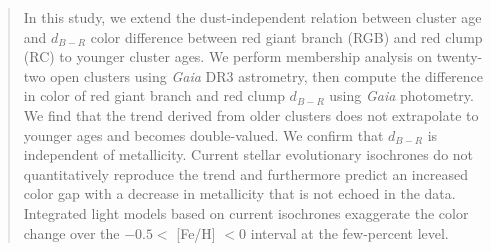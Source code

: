 \documentclass[twocolumn,times]{aastex631}
\begin{document}

\author[0009-0003-8929-7110]{Abigail R. Chriss}

\author[0000-0003-1388-5525]{Guy Worthey}



\begin{abstract}

In this study, we extend the dust-independent \citet{1991MNRAS.251..545H} relation between cluster age and $d_{B-R}$ color difference between red giant branch (RGB) and red clump (RC) to younger cluster ages. We perform membership analysis on twenty-two open clusters using \textit{Gaia} DR3 astrometry, then compute the difference in color of red giant branch and red clump $d_{B-R}$ using \textit{Gaia} photometry. We find that the trend derived from older clusters does not extrapolate to younger ages and becomes double-valued. We confirm that $d_{B-R}$ is independent of metallicity. Current stellar evolutionary isochrones do not quantitatively reproduce the trend and furthermore predict an increased color gap with a decrease in metallicity that is not echoed in the data. Integrated light models based on current isochrones exaggerate the color change over the $-0.5 <$ [Fe/H] $< 0$ interval at the few-percent level.

\end{abstract}

\end{document}

